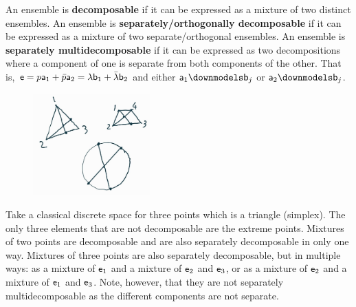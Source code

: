 
\begin{mathSection}
	\begin{defn}
		An ensemble is \textbf{decomposable} if it can be expressed as a mixture of two distinct ensembles. An ensemble is \textbf{separately/orthogonally decomposable} if it can be expressed as a mixture of two separate/orthogonal ensembles. An ensemble is \textbf{separately multidecomposable} if it can be expressed as two decompositions where a component of one is separate from both components of the other. That is, $\ens = p \ens[a]_1 + \bar{p} \ens[a]_2 = \lambda \ens[b]_1 +\bar{\lambda} \ens[b]_2$ and either $\ens[a]_1 \separate \ens[b]_j$ or $\ens[a]_2 \separate \ens[b]_j$.
	\end{defn}
	
	\begin{figure}[H]
		\centering
		\includegraphics[width=0.4\textwidth]{tempimages/MultipleDecomposition.jpg}
	\end{figure}
	
	\begin{remark}
		Take a classical discrete space for three points which is a triangle (simplex). The only three elements that are not decomposable are the extreme points. Mixtures of two points are decomposable and are also separately decomposable in only one way. Mixtures of three points are also separately decomposable, but in multiple ways: as a mixture of $\ens_1$ and a mixture of $\ens_2$ and $\ens_3$, or as a mixture of $\ens_2$ and a mixture of $\ens_1$ and $\ens_3$. Note, however, that they are not separately multidecomposable as the different components are not separate.
		

\end{remark}
\end{mathSection}
